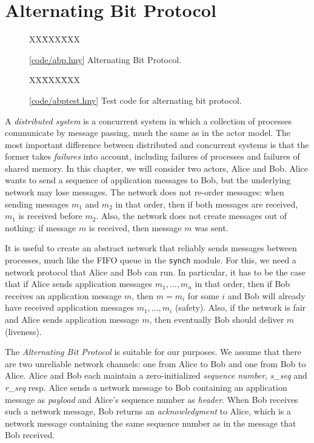 \documentclass{report}
\newcommand{\harmonysource}[1]{
\begin{tabbing}
XX\=XXX\=XXX\kill
    
\end{tabbing}
}
\newcommand{\harmonylink}[1]{%
[\href{https://www.cs.cornell.edu/home/rvr/harmony/#1}{\underline{#1}}]%
}
\newenvironment{code}{
\tcolorbox
}{
\endtcolorbox
}
\begin{document}
\chapter{Alternating Bit Protocol}
\label{ch:abp}
%
%
%

\begin{figure}
\begin{code}
\harmonysource{abp}
\end{code}
\caption{\harmonylink{code/abp.hny} Alternating Bit Protocol.}
\label{fig:abp}
\end{figure}

\begin{figure}
\begin{code}
\harmonysource{abptest}
\end{code}
\caption{\harmonylink{code/abptest.hny} Test code for alternating bit protocol.}
\label{fig:abptest}
\end{figure}

A
\emph{distributed system}
%
is a concurrent system in which a collection
of processes communicate by message passing, much the same as
in the actor model.
The most important difference between distributed and concurrent
systems is that the former takes \emph{failures}
%
into account,
including failures of processes and failures of shared memory.
In this chapter, we will consider two actors, Alice and Bob.
Alice wants to send a sequence of application messages to Bob,
but the underlying network may lose messages.
%
The network does not re-order messages: when sending messages
$m_1$ and $m_2$ in that order, then if both messages are received,
$m_1$ is received before $m_2$.
Also, the network does not create messages out of nothing: if
message $m$ is received, then message $m$ was sent.

It is useful to create an abstract network that reliably sends messages
between processes, much like the FIFO queue in the \texttt{synch} module.
For this, we need a network protocol that Alice and Bob can run.
In particular, it has to be the case that if Alice sends application
messages $m_1, ..., m_n$ in that order, then if Bob receives an
application message
$m$, then $m = m_i$ for some $i$ and Bob will already have received
application messages $m_1, ..., m_i$ (safety).
Also, if the network is fair and Alice sends application message
$m$, then eventually Bob should deliver $m$ (liveness).

The \emph{Alternating Bit Protocol} is suitable for our purposes.
We assume that there are two unreliable network channels: one from Alice
to Bob and one from Bob to Alice.
Alice and Bob each maintain a zero-initialized
\emph{sequence number},
%
\textit{s\_seq} and \textit{r\_seq} resp.
Alice sends a network message to Bob containing an
application message as \emph{payload} and Alice's sequence number
as \emph{header}.
When Bob receives such a network message, Bob returns an
\emph{acknowledgment}
%
to Alice, which is a network message
containing the same sequence number as in the message that Bob received.
\end{document}

